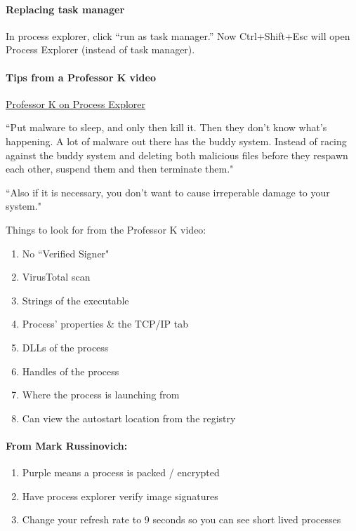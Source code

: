 \documentclass{article}
\begin{document}
\paragraph{Replacing task manager}
In process explorer, click ``run as task manager.'' Now Ctrl+Shift+Esc will open Process Explorer (instead of task manager).

\paragraph{Tips from a Professor K video}
\href{https://youtu.be/y2bNLCWHFNs}{Professor K on Process Explorer}

``Put malware to sleep, and only then kill it. 
Then they don't know what's happening.
A lot of malware out there has
the buddy system. Instead of racing against the buddy system
and deleting both malicious files before they respawn each other,
suspend them and then terminate them."

``Also if it is necessary, you don't want to cause irreperable damage to your system."

Things to look for from the Professor K video:
\begin{enumerate}
        \item No ``Verified Signer"
        \item VirusTotal scan
        \item Strings of the executable
        \item Process' properties \& the TCP/IP tab
        \item DLLs of the process
        \item Handles of the process
        \item Where the process is launching from
        \item Can view the autostart location from the registry
\end{enumerate}

\paragraph{From Mark Russinovich:}
\begin{enumerate}
        \item Purple means a process is packed / encrypted
        \item Have process explorer verify image signatures
        \item Change your refresh rate to 9 seconds so you can see short lived processes
\end{enumerate}
\end{document}
